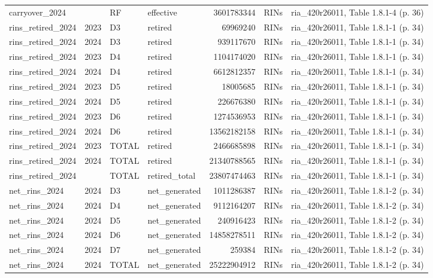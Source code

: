 \begin{longtable}{p{2.3cm}p{0.7cm}p{1.0cm}p{2.6cm}rp{1.7cm}p{4.6cm}}
carryover\_2024 &  & RF & effective & 3601783344 & RINs & ria\_420r26011, Table 1.8.1-4 (p. 36) \\
rins\_retired\_2024 & 2023 & D3 & retired & 69969240 & RINs & ria\_420r26011, Table 1.8.1-1 (p. 34) \\
rins\_retired\_2024 & 2024 & D3 & retired & 939117670 & RINs & ria\_420r26011, Table 1.8.1-1 (p. 34) \\
rins\_retired\_2024 & 2023 & D4 & retired & 1104174020 & RINs & ria\_420r26011, Table 1.8.1-1 (p. 34) \\
rins\_retired\_2024 & 2024 & D4 & retired & 6612812357 & RINs & ria\_420r26011, Table 1.8.1-1 (p. 34) \\
rins\_retired\_2024 & 2023 & D5 & retired & 18005685 & RINs & ria\_420r26011, Table 1.8.1-1 (p. 34) \\
rins\_retired\_2024 & 2024 & D5 & retired & 226676380 & RINs & ria\_420r26011, Table 1.8.1-1 (p. 34) \\
rins\_retired\_2024 & 2023 & D6 & retired & 1274536953 & RINs & ria\_420r26011, Table 1.8.1-1 (p. 34) \\
rins\_retired\_2024 & 2024 & D6 & retired & 13562182158 & RINs & ria\_420r26011, Table 1.8.1-1 (p. 34) \\
rins\_retired\_2024 & 2023 & TOTAL & retired & 2466685898 & RINs & ria\_420r26011, Table 1.8.1-1 (p. 34) \\
rins\_retired\_2024 & 2024 & TOTAL & retired & 21340788565 & RINs & ria\_420r26011, Table 1.8.1-1 (p. 34) \\
rins\_retired\_2024 &  & TOTAL & retired\_total & 23807474463 & RINs & ria\_420r26011, Table 1.8.1-1 (p. 34) \\
net\_rins\_2024 & 2024 & D3 & net\_generated & 1011286387 & RINs & ria\_420r26011, Table 1.8.1-2 (p. 34) \\
net\_rins\_2024 & 2024 & D4 & net\_generated & 9112164207 & RINs & ria\_420r26011, Table 1.8.1-2 (p. 34) \\
net\_rins\_2024 & 2024 & D5 & net\_generated & 240916423 & RINs & ria\_420r26011, Table 1.8.1-2 (p. 34) \\
net\_rins\_2024 & 2024 & D6 & net\_generated & 14858278511 & RINs & ria\_420r26011, Table 1.8.1-2 (p. 34) \\
net\_rins\_2024 & 2024 & D7 & net\_generated & 259384 & RINs & ria\_420r26011, Table 1.8.1-2 (p. 34) \\
net\_rins\_2024 & 2024 & TOTAL & net\_generated & 25222904912 & RINs & ria\_420r26011, Table 1.8.1-2 (p. 34) \\

\end{longtable}
